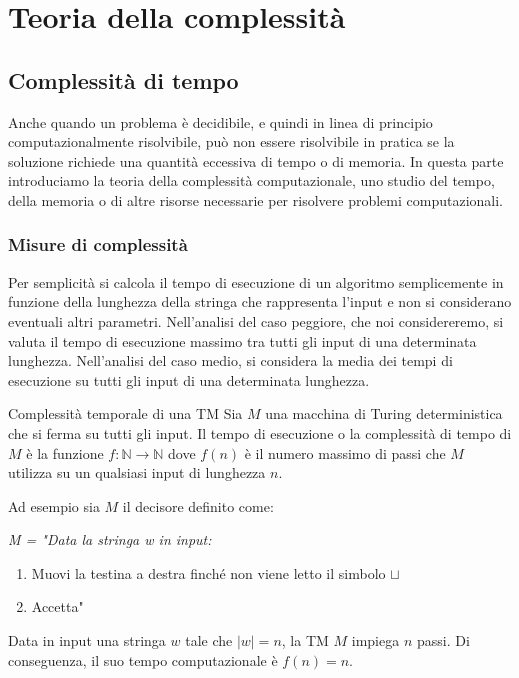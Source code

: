 \part{Teoria della complessità}
\chapter{Complessità di tempo}
Anche quando un problema è decidibile, e quindi in linea di principio computazionalmente risolvibile, può non essere risolvibile in pratica se la soluzione richiede una quantità eccessiva di tempo o di memoria. In questa parte introduciamo la teoria della complessità computazionale, uno studio del tempo, della memoria o di altre risorse necessarie per risolvere problemi computazionali.

\section{Misure di complessità}
Per semplicità si calcola il tempo di esecuzione di un algoritmo semplicemente in funzione della lunghezza della stringa che rappresenta l'input e non si considerano eventuali altri parametri. Nell'analisi del caso peggiore, che noi considereremo, si valuta il tempo di esecuzione massimo tra tutti gli input di una determinata lunghezza. Nell'analisi del caso medio, si considera la media dei tempi di esecuzione su tutti gli input di una determinata lunghezza.

\begin{Definition}{Complessità temporale di una TM}{}
Sia $M$ una macchina di Turing deterministica che si ferma su tutti gli input. Il tempo di esecuzione o la complessità di tempo di $M$ è la funzione $f: \mathbb{N}\longrightarrow\mathbb{N}$ dove $f(n)$ è il numero massimo di passi che $M$ utilizza su un qualsiasi input di lunghezza $n$.  
\end{Definition}

Ad esempio sia $M$ il decisore definito come:

\textit{M = "Data la stringa w in input:}
\begin{enumerate}
    \item Muovi la testina a destra finché non viene letto il simbolo $\sqcup$
    \item Accetta"
\end{enumerate}
Data in input una stringa $w$ tale che $|w| = n$, la TM $M$ impiega $n$ passi. Di conseguenza, il suo tempo computazionale è $f(n) = n$.

